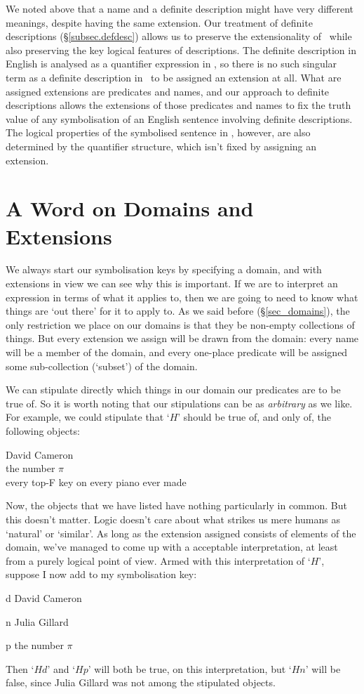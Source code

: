 We noted above that a name and a definite description might have very different meanings, despite having the same extension. Our treatment of definite descriptions (§\ref{subsec.defdesc}) allows us to preserve the extensionality of \FOL\ while also preserving the key logical features of descriptions. The definite description in English is analysed as a quantifier expression in \FOL, so there is no such singular term as a definite description in \FOL\ to be assigned an extension at all. What are assigned extensions are predicates and names, and our approach to definite descriptions allows the extensions of those predicates and names to fix the truth value of any symbolisation of an English sentence involving definite descriptions. The logical properties of the symbolised sentence in \FOL, however, are also determined by the quantifier structure, which isn't fixed by assigning an extension.



\section{A Word on Domains and Extensions}

We always start our symbolisation keys by specifying a domain, and with extensions in view we can see why this is important. If we are to interpret an expression in terms of what it applies to, then we are going to need to know what things are `out there' for it to apply to. As we said before (§\ref{sec_domains}), the only restriction we place on our domains is that they be non-empty collections of things. But every extension we assign will be drawn from the domain: every name will be a member of the domain, and every one-place predicate will be assigned some sub-collection (`subset') of the domain. 

We can stipulate directly which things in our domain our predicates are to be true of. So it is worth noting that our stipulations can be as \emph{arbitrary} as we like. For example, we could stipulate that `$H$' should be true of, and only of, the following objects:
	\begin{center}
		David Cameron\\
		the number $\pi$\\
		every top-F key on every piano ever made
	\end{center}
Now, the objects that we have listed have nothing particularly in common. But this doesn't matter. Logic doesn't care about what strikes us mere humans as `natural' or `similar'. As long as the extension assigned consists of elements of the domain, we've managed to come up with a acceptable interpretation, at least from a purely logical point of view.  Armed with this interpretation of `$H$', suppose I now add to my symbolisation key:
	\begin{ekey}
		\item[d] David Cameron
		\item[n] Julia Gillard
		\item[p] the number $\pi$
	\end{ekey}
Then `$Hd$' and `$Hp$' will both be true, on this interpretation, but `$Hn$' will be false, since Julia Gillard was not among the stipulated objects. 

